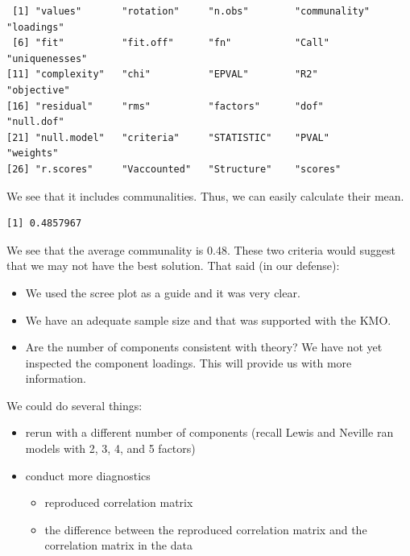 \documentclass[
  english,
]{book}
\newenvironment{Shaded}{\begin{snugshade}}{\end{snugshade}}
\newcommand{\CommentTok}[1]{\textcolor[rgb]{0.56,0.35,0.01}{\textit{#1}}}
\newcommand{\KeywordTok}[1]{\textcolor[rgb]{0.13,0.29,0.53}{\textbf{#1}}}
\newcommand{\NormalTok}[1]{#1}
\newcommand{\OperatorTok}[1]{\textcolor[rgb]{0.81,0.36,0.00}{\textbf{#1}}}
\providecommand{\tightlist}{%
  \setlength{\itemsep}{0pt}\setlength{\parskip}{0pt}}
\begin{document}
\begin{verbatim}
 [1] "values"       "rotation"     "n.obs"        "communality"  "loadings"    
 [6] "fit"          "fit.off"      "fn"           "Call"         "uniquenesses"
[11] "complexity"   "chi"          "EPVAL"        "R2"           "objective"   
[16] "residual"     "rms"          "factors"      "dof"          "null.dof"    
[21] "null.model"   "criteria"     "STATISTIC"    "PVAL"         "weights"     
[26] "r.scores"     "Vaccounted"   "Structure"    "scores"      
\end{verbatim}

We see that it includes communalities. Thus, we can easily calculate their mean.

\begin{Shaded}
\end{Shaded}

\begin{verbatim}
[1] 0.4857967
\end{verbatim}

\begin{Shaded}
\end{Shaded}

We see that the average communality is 0.48. These two criteria would suggest that we may not have the best solution. That said (in our defense):

\begin{itemize}
\tightlist
\item
  We used the scree plot as a guide and it was very clear.
\item
  We have an adequate sample size and that was supported with the KMO.
\item
  Are the number of components consistent with theory? We have not yet inspected the component loadings. This will provide us with more information.
\end{itemize}

We could do several things:

\begin{itemize}
\tightlist
\item
  rerun with a different number of components (recall Lewis and Neville \citeyearpar{lewis_construction_2015} ran models with 2, 3, 4, and 5 factors)
\item
  conduct more diagnostics

  \begin{itemize}
  \tightlist
  \item
    reproduced correlation matrix
  \item
    the difference between the reproduced correlation matrix and the correlation matrix in the data
  \end{itemize}
\end{itemize}
\end{document}
